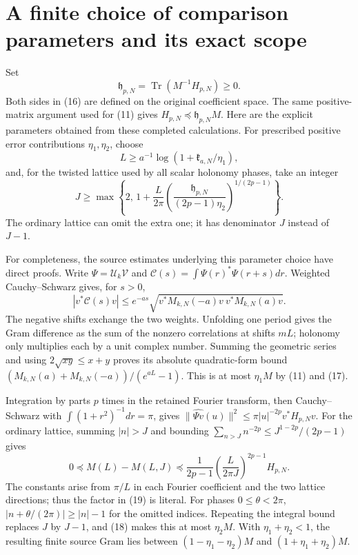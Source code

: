 \documentclass[11pt]{article}
\newcommand{\V}{\mathcal V}
\newcommand{\tr}{\operatorname{Tr}}
\begin{document}
\section{A finite choice of comparison parameters and its exact scope}
Set
\[
 \mathfrak h_{p,N}=\tr(M^{-1}H_{p,N})\ge0.
 \tag{16}
\]
Both sides in (16) are defined on the original coefficient space.
The same positive-matrix argument used for (11) gives
\(H_{p,N}\preceq\mathfrak h_{p,N}M\).
Here are the explicit parameters obtained from these completed
calculations. For prescribed positive error contributions
\(\eta_1,\eta_2\), choose
\[
 L\ge a^{-1}\log(1+\mathfrak k_{a,N}/\eta_1),
 \tag{17}
\]
and, for the twisted lattice used by all scalar holonomy phases, take an integer
\[
 J\ge\max\left\{2,\,
 1+\frac L{2\pi}
 \left(\frac{\mathfrak h_{p,N}}{(2p-1)\eta_2}\right)^{1/(2p-1)}
 \right\}.
 \tag{18}
\]
The ordinary lattice can omit the extra one; it has denominator
\(J\) instead of \(J-1\).

For completeness, the source estimates underlying this parameter
choice have direct proofs. Write \(\Psi=\mathcal U_k\V\) and
\(\mathcal C(s)=\int\Psi(r)^*\Psi(r+s)dr\). Weighted
Cauchy--Schwarz gives, for \(s>0\),
\[
 |v^*\mathcal C(s)v|
 \le e^{-as}\sqrt{v^*M_{k,N}(-a)v\ v^*M_{k,N}(a)v}.
\]
The negative shifts exchange the two weights. Unfolding one period
gives the Gram difference as the sum of the nonzero correlations
at shifts \(mL\); holonomy only multiplies each by a unit complex
number. Summing the geometric series and using \(2\sqrt{xy}\le x+y\)
proves its absolute quadratic-form bound
\((M_{k,N}(a)+M_{k,N}(-a))/(e^{aL}-1)\).
This is at most \(\eta_1M\) by (11) and (17).

Integration by parts \(p\) times in the retained Fourier transform,
then Cauchy--Schwarz with
\(\int(1+r^2)^{-1}dr=\pi\), gives
\(\|\widehat{\Psi v}(u)\|^2\le
\pi |u|^{-2p}v^*H_{p,N}v\).
For the ordinary lattice, summing \(|n|>J\) and bounding
\(\sum_{n>J}n^{-2p}\le J^{1-2p}/(2p-1)\) gives
\[
 0\preceq M(L)-M(L,J)
 \preceq\frac1{2p-1}\left(\frac L{2\pi J}\right)^{2p-1}H_{p,N}.
 \tag{19}
\]
The constants arise from \(\pi/L\) in each Fourier coefficient and
the two lattice directions; thus the factor in (19) is literal.
For phases \(0\le\theta<2\pi\),
\(|n+\theta/(2\pi)|\ge |n|-1\) for the omitted indices. Repeating
the integral bound replaces \(J\) by \(J-1\), and (18) makes this
at most \(\eta_2M\). With \(\eta_1+\eta_2<1\), the resulting
finite source Gram lies between
\((1-\eta_1-\eta_2)M\) and
\((1+\eta_1+\eta_2)M\).
\end{document}
